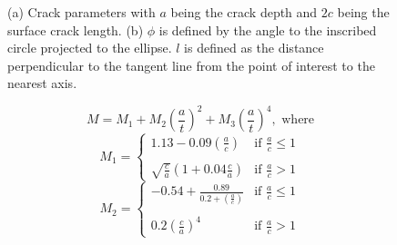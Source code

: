  \begin{figure}%
 	\centering
 	\qquad
 	\caption{(a) Crack parameters with $a$ being the crack depth and $2c$ being the surface crack length. (b) $\phi$ is defined by the angle to the inscribed circle projected to the ellipse. $l$ is defined as the distance perpendicular to the tangent line from the point of interest to the nearest axis.}%
 	\label{fig:crack_params}%
 \end{figure}
\begin{equation} \label{eqn:RN_M}
    M = M_1 + M_2\left(\frac{a}{t}\right)^2 + M_3\left(\frac{a}{t}\right)^4, \text{ where}
\end{equation}
\begin{equation} \label{eqn:RN_M1}
    M_1 = \begin{cases}
    1.13 - 0.09\left(\frac{a}{c}\right) & \text{if } \frac{a}{c} \le 1 \\
    \\
    \sqrt{\frac{c}{a}}\left(1 + 0.04\frac{c}{a}\right) & \text{if } \frac{a}{c} > 1
    \end{cases}
\end{equation}
\begin{equation} \label{eqn:RN_M2}
    M_2 = \begin{cases}
    -0.54 + \frac{0.89}{0.2+\left(\frac{a}{c}\right)} & \text{if } \frac{a}{c} \le 1 \\
    \\
    0.2\left(\frac{c}{a}\right)^4 & \text{if } \frac{a}{c} > 1
    \end{cases}
\end{equation}
